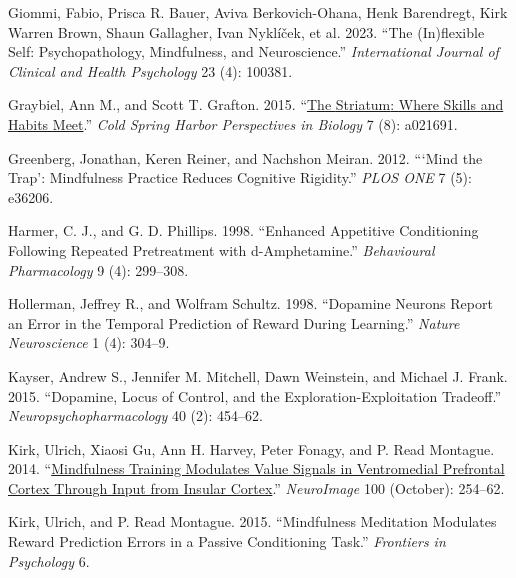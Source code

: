 \documentclass{article}
\newlength{\cslhangindent}
\newlength{\cslentryspacingunit} %
\newenvironment{CSLReferences}[2] %
 {%
  \setlength{\parindent}{0pt}
  \ifodd #1
  \let\oldpar\par
  \def\par{\hangindent=\cslhangindent\oldpar}
  \fi
  \setlength{\parskip}{#2\cslentryspacingunit}
 }%
 {}
\begin{document}
\begin{CSLReferences}{1}{0}
\leavevmode{}%
Giommi, Fabio, Prisca R. Bauer, Aviva Berkovich-Ohana, Henk Barendregt,
Kirk Warren Brown, Shaun Gallagher, Ivan Nyklíček, et al. 2023. {``The
({In})flexible Self: {Psychopathology}, Mindfulness, and
Neuroscience.''} \emph{International Journal of Clinical and Health
Psychology} 23 (4): 100381.

\leavevmode{}%
Graybiel, Ann M., and Scott T. Grafton. 2015.
{``\href{https://www.ncbi.nlm.nih.gov/pubmed/26238359}{The {Striatum}:
{Where Skills} and {Habits Meet}}.''} \emph{Cold Spring Harbor
Perspectives in Biology} 7 (8): a021691.

\leavevmode{}%
Greenberg, Jonathan, Keren Reiner, and Nachshon Meiran. 2012.
{``{`{Mind} the {Trap}'}: {Mindfulness Practice Reduces Cognitive
Rigidity}.''} \emph{PLOS ONE} 7 (5): e36206.

\leavevmode{}%
Harmer, C. J., and G. D. Phillips. 1998. {``Enhanced Appetitive
Conditioning Following Repeated Pretreatment with d-Amphetamine.''}
\emph{Behavioural Pharmacology} 9 (4): 299--308.

\leavevmode{}%
Hollerman, Jeffrey R., and Wolfram Schultz. 1998. {``Dopamine Neurons
Report an Error in the Temporal Prediction of Reward During Learning.''}
\emph{Nature Neuroscience} 1 (4): 304--9.

\leavevmode{}%
Kayser, Andrew S., Jennifer M. Mitchell, Dawn Weinstein, and Michael J.
Frank. 2015. {``Dopamine, {Locus} of {Control}, and the
{Exploration-Exploitation Tradeoff}.''} \emph{Neuropsychopharmacology}
40 (2): 454--62.

\leavevmode{}%
Kirk, Ulrich, Xiaosi Gu, Ann H. Harvey, Peter Fonagy, and P. Read
Montague. 2014.
{``\href{https://www.ncbi.nlm.nih.gov/pmc/articles/PMC4140407}{Mindfulness
Training Modulates Value Signals in Ventromedial Prefrontal Cortex
Through Input from Insular Cortex}.''} \emph{NeuroImage} 100 (October):
254--62.

\leavevmode{}%
Kirk, Ulrich, and P. Read Montague. 2015. {``Mindfulness Meditation
Modulates Reward Prediction Errors in a Passive Conditioning Task.''}
\emph{Frontiers in Psychology} 6.


\end{CSLReferences}
\end{document}
